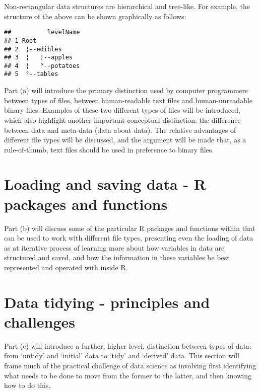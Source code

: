 \documentclass[]{book}
\newenvironment{Shaded}{\begin{snugshade}}{\end{snugshade}}
\newcommand{\KeywordTok}[1]{\textcolor[rgb]{0.13,0.29,0.53}{\textbf{#1}}}
\newcommand{\StringTok}[1]{\textcolor[rgb]{0.31,0.60,0.02}{#1}}
\newcommand{\OperatorTok}[1]{\textcolor[rgb]{0.81,0.36,0.00}{\textbf{#1}}}
\newcommand{\NormalTok}[1]{#1}
\theoremstyle{definition}
\theoremstyle{definition}
\theoremstyle{definition}
\theoremstyle{remark}
\begin{document}
Non-rectangular data structures are hierarchical and tree-like. For
example, the structure of the above can be shown graphically as follows:

\begin{Shaded}
\end{Shaded}

\begin{verbatim}
##          levelName
## 1 Root            
## 2  ¦--edibles     
## 3  ¦   ¦--apples  
## 4  ¦   °--potatoes
## 5  °--tables
\end{verbatim}

Part (a) will introduce the primary distinction used by computer
programmers between types of files, between human-readable text files
and human-unreadable binary files. Examples of these two different types
of files will be introduced, which also highlight another important
conceptual distinction: the difference between data and meta-data (data
about data). The relative advantages of different file types will be
discussed, and the argument will be made that, as a rule-of-thumb, text
files should be used in preference to binary files.

\section{Loading and saving data - R packages and
functions}\label{loading-and-saving-data---r-packages-and-functions}

Part (b) will discuss some of the particular R packages and functions
within that can be used to work with different file types, presenting
even the loading of data as at iterative process of learning more about
how variables in data are structured and saved, and how the information
in these variables be best represented and operated with inside R.

\section{Data tidying - principles and
challenges}\label{data-tidying---principles-and-challenges}

Part (c) will introduce a further, higher level, distinction between
types of data: from `untidy' and `initial' data to `tidy' and `derived'
data. This section will frame much of the practical challenge of data
science as involving first identifying what needs to be done to move
from the former to the latter, and then knowing how to do this.
\end{document}
